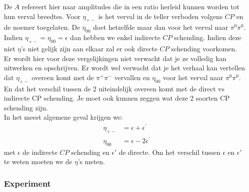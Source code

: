 \documentclass[../main.tex]{subfiles}
\begin{document}
De $A$ refereert hier naar amplitudes die in een ratio herleid kunnen worden tot hun verval breedtes. Voor $\eta_{+-}$ is het verval in  de teller verboden volgens $CP$ en de noemer toegelaten. De $\eta_{00}$ doet hetzelfde maar dan voor het verval naar $\pi^0\pi^0$. Indien $\eta_{+-}=\eta_{00}=\epsilon$ dan hebben we enkel indirecte $CP$ schending. Indien deze niet $\eta$'s niet gelijk zijn aan elkaar zal er ook directe $CP$ schending voorkomen.\\
{\color{red} Er wordt hier voor deze vergelijkingen niet verwacht dat je ze volledig kan uitwerken en opschrijven. Er wordt wel verwacht dat je het verhaal kan vertellen dat $\eta_{+-}$ overeen komt met de $\pi^+\pi^-$ vervallen en $\eta_{00}$ voor het verval naar $\pi^0\pi^0$. En dat het verschil tussen de 2 uiteindelijk overeen komt met de direct vs indirecte CP schending. Je moet ook kunnen zeggen wat deze 2 soorten CP schending zijn.}\\
In het meest algemene geval krijgen we:
\begin{equation}
    \begin{aligned}
        \label{eq:direct_indirect_algemeen}
        \eta_{+-} &=\epsilon+\epsilon^{\prime} \\
        \eta_{00} &=\epsilon-2 \epsilon^{\prime}
    \end{aligned}
\end{equation}
met $\epsilon$ de indirecte $CP$ schending en $\epsilon'$ de directe. Om het verschil tussen $\epsilon$ en $\epsilon'$ te weten moeten we de $\eta$'s meten.

\subsubsection{Experiment}%
\label{ssub:experiment}
\end{document}
